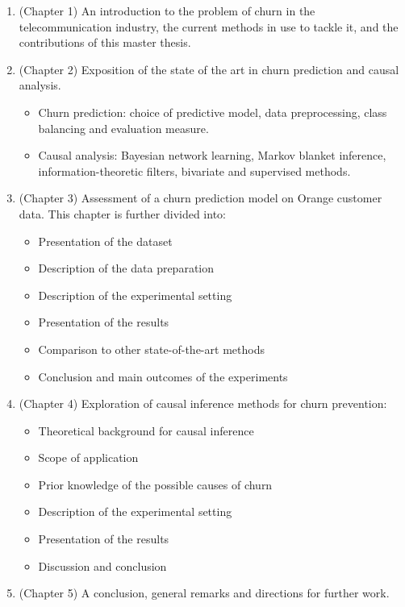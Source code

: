 \begin{enumerate}
	\item (Chapter 1) An introduction to the problem of churn in the
	telecommunication industry, the current methods in use to tackle it, and the
	contributions of this master thesis.

    \item (Chapter 2) Exposition of the state of the art in churn prediction
    and causal analysis.
    \begin{itemize}
        \item Churn prediction: choice of predictive model, data preprocessing,
        class balancing and evaluation measure.
        \item Causal analysis: Bayesian network learning, Markov blanket
        inference, information-theoretic filters, bivariate and supervised
        methods.
    \end{itemize}

	\item (Chapter 3) Assessment of a churn prediction model on Orange customer
	data. This chapter is further divided into:
	\begin{itemize}
		\item Presentation of the dataset
		\item Description of the data preparation
		\item Description of the experimental setting
		\item Presentation of the results
        \item Comparison to other state-of-the-art methods
		\item Conclusion and main outcomes of the experiments
	\end{itemize}

    \item (Chapter 4) Exploration of causal inference methods for churn
    prevention:
    \begin{itemize}
        \item Theoretical background for causal inference
        \item Scope of application
        \item Prior knowledge of the possible causes of churn
        \item Description of the experimental setting
        \item Presentation of the results
        \item Discussion and conclusion
    \end{itemize}

    \item (Chapter 5) A conclusion, general remarks and directions for further work.
\end{enumerate}

